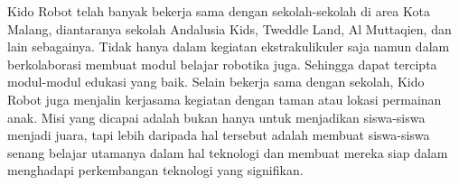 Kido Robot telah banyak bekerja sama dengan sekolah-sekolah di area Kota Malang, diantaranya sekolah Andalusia Kids, Tweddle Land, Al Muttaqien, dan lain sebagainya. Tidak hanya dalam kegiatan ekstrakulikuler saja namun dalam berkolaborasi membuat modul belajar robotika juga. Sehingga dapat tercipta modul-modul edukasi yang baik. Selain bekerja sama dengan sekolah, Kido Robot juga menjalin kerjasama kegiatan dengan taman atau lokasi permainan anak. Misi yang dicapai adalah bukan hanya untuk menjadikan siswa-siswa menjadi juara, tapi lebih daripada hal tersebut adalah membuat siswa-siswa senang belajar utamanya dalam hal teknologi dan membuat mereka siap dalam menghadapi perkembangan teknologi yang signifikan. 
